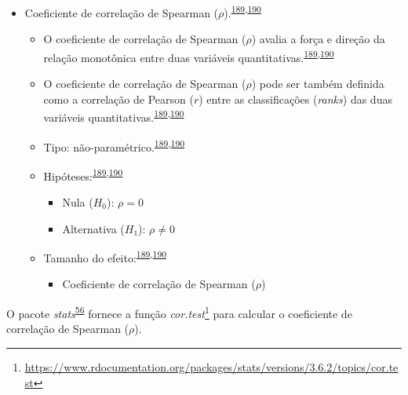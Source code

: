 \documentclass[
  a4paper,
]{book}
\providecommand{\tightlist}{%
  \setlength{\itemsep}{0pt}\setlength{\parskip}{0pt}}
\renewcommand{\href}[2]{#2\footnote{\url{#1}}}
\newenvironment{infobox}[1]
  {
  \begin{itemize}
  \renewcommand{\labelitemi}{
    \raisebox{-.7\height}[0pt][0pt]{
      {\setkeys{Gin}{width=3em,keepaspectratio}
        \texttt{[image: \#1]}}
    }
  }
  \setlength{\fboxsep}{1em}
  \begin{blackbox}
  \item
  }
  {
  \end{blackbox}
  \end{itemize}
  }
\begin{document}
\begin{itemize}
\item
  Coeficiente de correlação de Spearman (\(\rho\)).\textsuperscript{\protect\hyperlink{ref-khamis2008}{189},\protect\hyperlink{ref-allison2022}{190}}

  \begin{itemize}
  \item
    O coeficiente de correlação de Spearman (\(\rho\)) avalia a força e direção da relação monotônica entre duas variáveis quantitativas.\textsuperscript{\protect\hyperlink{ref-khamis2008}{189},\protect\hyperlink{ref-allison2022}{190}}
  \item
    O coeficiente de correlação de Spearman (\(\rho\)) pode ser também definida como a correlação de Pearson (\(r\)) entre as classificações (\emph{ranks}) das duas variáveis quantitativas.\textsuperscript{\protect\hyperlink{ref-khamis2008}{189},\protect\hyperlink{ref-allison2022}{190}}
  \item
    Tipo: não-paramétrico.\textsuperscript{\protect\hyperlink{ref-khamis2008}{189},\protect\hyperlink{ref-allison2022}{190}}
  \item
    Hipóteses:\textsuperscript{\protect\hyperlink{ref-khamis2008}{189},\protect\hyperlink{ref-allison2022}{190}}

    \begin{itemize}
    \item
      Nula (\(H_{0}\)): \(\rho=0\)
    \item
      Alternativa (\(H_{1}\)): \(\rho≠0\)
    \end{itemize}
  \item
    Tamanho do efeito:\textsuperscript{\protect\hyperlink{ref-khamis2008}{189},\protect\hyperlink{ref-allison2022}{190}}

    \begin{itemize}
    \tightlist
    \item
      Coeficiente de correlação de Spearman (\(\rho\))
    \end{itemize}
  \end{itemize}
\end{itemize}

\begin{infobox}{images/Rlogo}
O pacote \emph{stats}\textsuperscript{\protect\hyperlink{ref-stats-2}{56}} fornece a função \href{https://www.rdocumentation.org/packages/stats/versions/3.6.2/topics/cor.test}{\emph{cor.test}} para calcular o coeficiente de correlação de Spearman (\(\rho\)).

\end{infobox}
\end{document}
